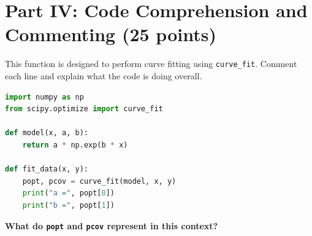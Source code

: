 \documentclass[12pt]{article}
\begin{document}
\newpage
\section*{Part IV: Code Comprehension and Commenting (25 points)}

This function is designed to perform curve fitting using \texttt{curve\_fit}. Comment each line and explain what the code is doing overall.

\begin{lstlisting}[language=Python]
import numpy as np
from scipy.optimize import curve_fit

def model(x, a, b):
    return a * np.exp(b * x)

def fit_data(x, y):
    popt, pcov = curve_fit(model, x, y)
    print("a =", popt[0])
    print("b =", popt[1])
\end{lstlisting}

\vspace{3in}

\textbf{What do \texttt{popt} and \texttt{pcov} represent in this context?}

\vspace{2in}
\end{document}
